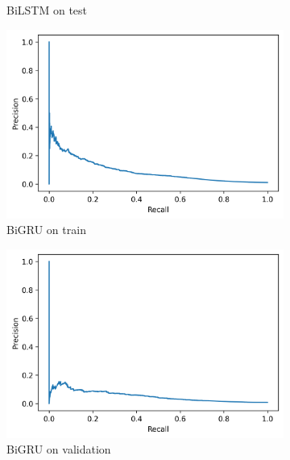 \documentclass[utf8x]{ctexart}
\begin{document}
\begin{figure}[htb]
\begin{subfigure}[b]{0.32\textwidth}
    \caption{BiLSTM on test}
    \label{fig:BiLSTM_prc_test}
  \end{subfigure}


  \begin{subfigure}[b]{0.32\textwidth}
    \centering
    \includegraphics[width=\textwidth]{../images/BiGRU_train_prc.png}
    \caption{BiGRU on train}
    \label{fig:BiGRU_prc_train}
  \end{subfigure}
  \begin{subfigure}[b]{0.32\textwidth}
    \centering
    \includegraphics[width=\textwidth]{../images/BiGRU_val_prc.png}
    \caption{BiGRU on validation}
    \label{fig:BiGRU_prc_val}
  \end{subfigure}
  \begin{subfigure}[b]{0.32\textwidth}
    \centering

\end{subfigure}
\end{figure}
\end{document}

